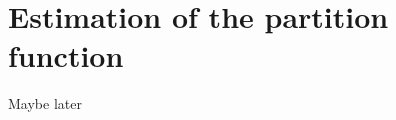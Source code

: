 \documentclass[12pt]{article}
\begin{document}
\section{Estimation of the partition function}
Maybe later
\end{document}
